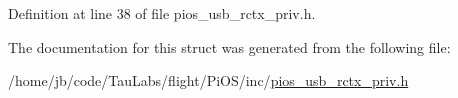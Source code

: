 \-Definition at line 38 of file pios\-\_\-usb\-\_\-rctx\-\_\-priv.\-h.



\-The documentation for this struct was generated from the following file\-:\begin{DoxyCompactItemize}
\item 
/home/jb/code/\-Tau\-Labs/flight/\-Pi\-O\-S/inc/\hyperlink{pios__usb__rctx__priv_8h}{pios\-\_\-usb\-\_\-rctx\-\_\-priv.\-h}\end{DoxyCompactItemize}

